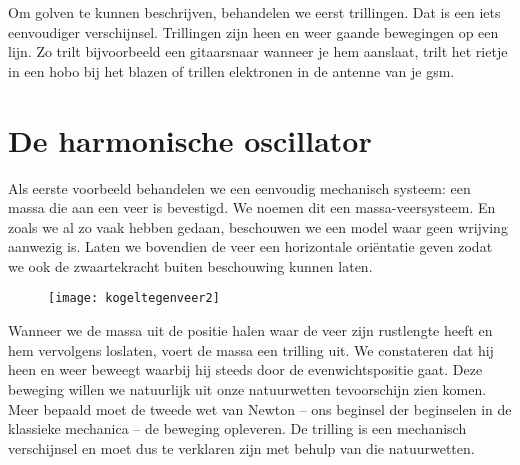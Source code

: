 \documentclass{ximera}
\begin{document}
	\author{Bart Lambregs}



	Om golven te kunnen beschrijven, behandelen we eerst trillingen. Dat is een iets eenvoudiger verschijnsel. Trillingen zijn heen en weer gaande bewegingen op een lijn. Zo trilt bijvoorbeeld een gitaarsnaar wanneer je hem aanslaat, trilt het rietje in een hobo bij het blazen of trillen elektronen in de antenne van je gsm.
	

	

	
	
	\section{De harmonische oscillator}
	
	Als eerste voorbeeld behandelen we een eenvoudig mechanisch systeem: een massa die aan een veer is bevestigd. We noemen dit een massa-veersysteem. En zoals we al zo vaak hebben gedaan, beschouwen we een model waar geen wrijving aanwezig is. Laten we bovendien de veer een horizontale ori\"entatie geven zodat we ook de zwaartekracht buiten beschouwing kunnen laten.
	\begin{figure}[h]
	\centering
	\texttt{[image: kogeltegenveer2]}
	\end{figure}
	Wanneer we de massa uit de positie halen waar de veer zijn rustlengte heeft en hem vervolgens loslaten, voert de massa een trilling uit. We constateren dat hij heen en weer beweegt waarbij hij steeds door de evenwichtspositie gaat. Deze beweging willen we natuurlijk uit onze natuurwetten tevoorschijn zien komen. Meer bepaald moet de tweede wet van Newton -- ons beginsel der beginselen in de klassieke mechanica -- de beweging opleveren. De trilling is een mechanisch verschijnsel en moet dus te verklaren zijn met behulp van die natuurwetten. 
	
\end{document}
